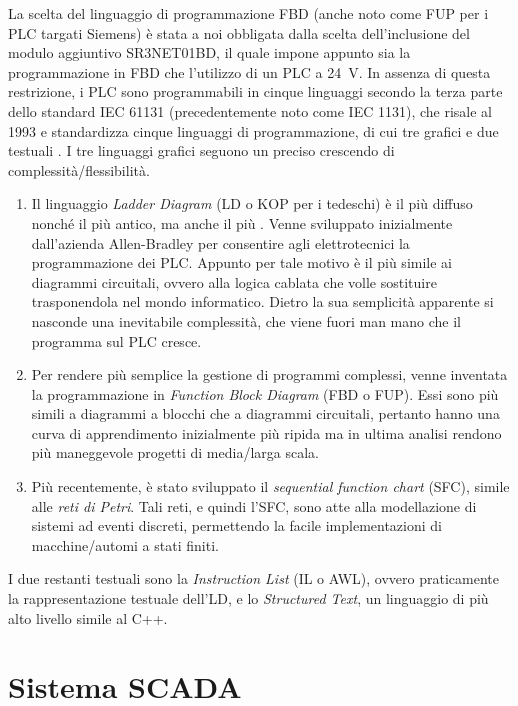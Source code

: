 \enlargethispage{-1\baselineskip}
La scelta del linguaggio di programmazione FBD (anche noto come FUP per i PLC targati Siemens) è
stata a noi obbligata dalla scelta dell'inclusione del modulo aggiuntivo SR3NET01BD, il quale impone
appunto sia la programmazione in FBD che l'utilizzo di un PLC a \qty{24}{\volt}. In assenza di
questa restrizione, i PLC sono programmabili in cinque linguaggi secondo la terza parte dello
standard IEC 61131 (precedentemente noto come IEC 1131), che risale al 1993 e standardizza cinque
linguaggi di programmazione, di cui tre grafici e due testuali \cite{lewis_1998}. I tre linguaggi
grafici seguono un preciso crescendo di complessità/flessibilità.
\begin{enumerate}
    \item Il linguaggio \emph{Ladder Diagram} (LD o KOP per i tedeschi) è il più diffuso nonché il
        più antico, ma anche il più . Venne sviluppato inizialmente dall'azienda
        Allen-Bradley per consentire agli elettrotecnici la programmazione dei PLC. Appunto per tale
        motivo è il più simile ai diagrammi circuitali, ovvero alla logica cablata che volle
        sostituire trasponendola nel mondo informatico. Dietro la sua semplicità apparente si
        nasconde una inevitabile complessità, che viene fuori man mano che il programma sul PLC
        cresce.
    \item Per rendere più semplice la gestione di programmi complessi, venne inventata la
        programmazione in \emph{Function Block Diagram} (FBD o FUP). Essi sono più simili a
        diagrammi a blocchi che a diagrammi circuitali, pertanto hanno una curva di apprendimento
        inizialmente più ripida ma in ultima analisi rendono più maneggevole progetti di media/larga
        scala.
    \item Più recentemente, è stato sviluppato il \emph{sequential function chart} (SFC), simile
        alle \emph{reti di Petri}. Tali reti, e quindi l'SFC, sono atte alla modellazione di sistemi
        ad eventi discreti, permettendo la facile implementazioni di macchine/automi a stati finiti.
\end{enumerate}
I due restanti testuali sono la \emph{Instruction List} (IL o AWL), ovvero praticamente la
rappresentazione testuale dell'LD, e lo \emph{Structured Text}, un linguaggio di più alto livello
simile al C++.

\section{Sistema SCADA}

